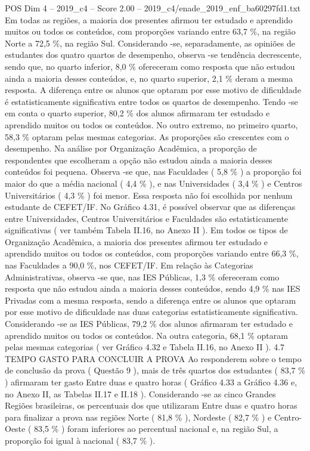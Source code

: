 \begin{textsample}{POS Dim 4 – 2019\_c4 – Score 2.00 – 2019\_c4/enade\_2019\_enf\_ba60297fd1.txt}
Em todas as regiões, a maioria dos presentes afirmou ter estudado e aprendido muitos ou todos os conteúdos, com proporções variando entre 63,7 \%, na região Norte a 72,5 \%, na região Sul.
Considerando -se, separadamente, as opiniões de estudantes dos quatro quartos de desempenho, observa -se tendência decrescente, sendo que, no quarto inferior, 8,0 \% ofereceram como resposta que não estudou ainda a maioria desses conteúdos, e, no quarto superior, 2,1 \% deram a mesma resposta.
A diferença entre os alunos que optaram por esse motivo de dificuldade é estatisticamente significativa entre todos os quartos de desempenho.
Tendo -se em conta o quarto superior, 80,2 \% dos alunos afirmaram ter estudado e aprendido muitos ou todos os conteúdos.
No outro extremo, no primeiro quarto, 58,3 \% optaram pelas mesmas categorias.
As proporções são crescentes com o desempenho.
Na análise por Organização Acadêmica, a proporção de respondentes que escolheram a opção não estudou ainda a maioria desses conteúdos foi pequena.
Observa -se que, nas Faculdades ( 5,8 \% ) a proporção foi maior do que a média nacional ( 4,4 \% ), e nas Universidades ( 3,4 \% ) e Centros Universitários ( 4,3 \% ) foi menor.
Essa resposta não foi escolhida por nenhum estudante de CEFET/IF.
No Gráfico 4.31, é possível observar que as diferenças entre Universidades, Centros Universitários e Faculdades são estatisticamente significativas ( ver também Tabela II.16, no Anexo II ).
Em todos os tipos de Organização Acadêmica, a maioria dos presentes afirmou ter estudado e aprendido muitos ou todos os conteúdos, com proporções variando entre 66,3 \%, nas Faculdades a 90,0 \%, nos CEFET/IF.
Em relação às Categorias Administrativas, observa -se que, nas IES Públicas, 1,3 \% ofereceram como resposta que não estudou ainda a maioria desses conteúdos, sendo 4,9 \% nas IES Privadas com a mesma resposta, sendo a diferença entre os alunos que optaram por esse motivo de dificuldade nas duas categorias estatisticamente significativa.
Considerando -se as IES Públicas, 79,2 \% dos alunos afirmaram ter estudado e aprendido muitos ou todos os conteúdos.
Na outra categoria, 68,1 \% optaram pelas mesmas categorias ( ver Gráfico 4.32 e Tabela II.16, no Anexo II ). 4.7 TEMPO GASTO PARA CONCLUIR A PROVA Ao responderem sobre o tempo de conclusão da prova ( Questão 9 ), mais de três quartos dos estudantes ( 83,7 \% ) afirmaram ter gasto Entre duas e quatro horas ( Gráfico 4.33 a Gráfico 4.36 e, no Anexo II, as Tabelas II.17 e II.18 ).
Considerando -se as cinco Grandes Regiões brasileiras, os percentuais dos que utilizaram Entre duas e quatro horas para finalizar a prova nas regiões Norte ( 81,8 \% ), Nordeste ( 82,7 \% ) e Centro-Oeste ( 83,5 \% ) foram inferiores ao percentual nacional e, na região Sul, a proporção foi igual à nacional ( 83,7 \% ).

\end{textsample}

